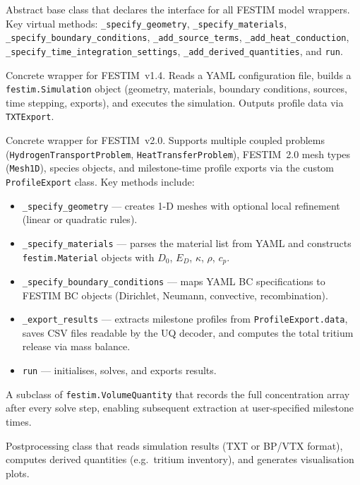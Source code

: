 \documentclass[11pt,a4paper]{article}
\begin{document}
\begin{description}[style=nextline]
  \item[\texttt{BaseModel}] Abstract base class that declares the interface
    for all FESTIM model wrappers.  Key virtual methods:
    \texttt{\_specify\_geometry}, \texttt{\_specify\_materials},
    \texttt{\_specify\_boundary\_conditions}, \texttt{\_add\_source\_terms},
    \texttt{\_add\_heat\_conduction}, \texttt{\_specify\_time\_integration\_settings},
    \texttt{\_add\_derived\_quantities}, and \texttt{run}.

  \item[\texttt{Model\_legacy}] Concrete wrapper for FESTIM~v1.4.  Reads a
    YAML configuration file, builds a \texttt{festim.Simulation} object
    (geometry, materials, boundary conditions, sources, time stepping,
    exports), and executes the simulation.  Outputs profile data via
    \texttt{TXTExport}.

  \item[\texttt{Model}] Concrete wrapper for FESTIM~v2.0.  Supports
    multiple coupled problems (\texttt{HydrogenTransportProblem},
    \texttt{HeatTransferProblem}), FESTIM~2.0 mesh types
    (\texttt{Mesh1D}), species objects, and milestone-time profile exports
    via the custom \texttt{ProfileExport} class.
    Key methods include:
    \begin{itemize}[nosep]
      \item \texttt{\_specify\_geometry} --- creates 1-D meshes with
            optional local refinement (linear or quadratic rules).
      \item \texttt{\_specify\_materials} --- parses the material list from
            YAML and constructs \texttt{festim.Material} objects with
            $D_0$, $E_D$, $\kappa$, $\rho$, $c_p$.
      \item \texttt{\_specify\_boundary\_conditions} --- maps YAML BC
            specifications to FESTIM BC objects (Dirichlet, Neumann,
            convective, recombination).
      \item \texttt{\_export\_results} --- extracts milestone profiles from
            \texttt{ProfileExport.data}, saves CSV files readable by the
            UQ decoder, and computes the total tritium release via mass
            balance.
      \item \texttt{run} --- initialises, solves, and exports results.
    \end{itemize}

  \item[\texttt{ProfileExport}] A subclass of \texttt{festim.VolumeQuantity}
    that records the full concentration array after every solve step,
    enabling subsequent extraction at user-specified milestone times.

  \item[\texttt{Diagnostics}] Postprocessing class that reads simulation
    results (TXT or BP/VTX format), computes derived quantities
    (e.g.\ tritium inventory), and generates visualisation plots.
\end{description}
\end{document}
